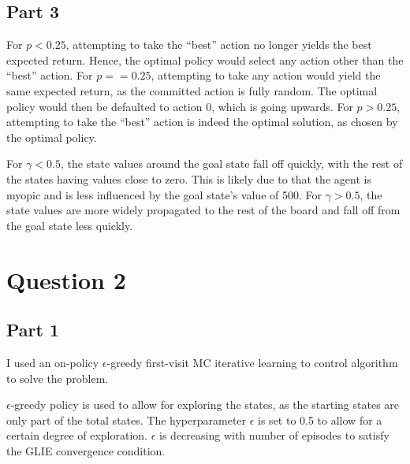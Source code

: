 \documentclass{article}
\begin{document}
    \subsection{Part 3}\label{subsec:question-1-3}
    For $p < 0.25$, attempting to take the ``best'' action no longer yields the best expected return.
    Hence, the optimal policy would select any action other than the ``best'' action.
    For $p == 0.25$, attempting to take any action would yield the same expected return, as the committed action is fully random.
    The optimal policy would then be defaulted to action 0, which is going upwards.
    For $p > 0.25$, attempting to take the ``best'' action is indeed the optimal solution, as chosen by the optimal policy.

    For $\gamma < 0.5$, the state values around the goal state fall off quickly, with the rest of the states having values close to zero.
    This is likely due to that the agent is myopic and is less influenced by the goal state's value of 500.
    For $\gamma > 0.5$, the state values are more widely propagated to the rest of the board and fall off from the goal state less quickly.


    \section{Question 2}\label{sec:question-2}

    \subsection{Part 1}\label{subsec:question-2-1}
    I used an on-policy $\epsilon$-greedy first-visit MC iterative learning to control algorithm to solve the problem.

    $\epsilon$-greedy policy is used to allow for exploring the states, as the starting states are only part of the total states.
    The hyperparameter $\epsilon$ is set to 0.5 to allow for a certain degree of exploration.
    $\epsilon$ is decreasing with number of episodes to satisfy the GLIE convergence condition.
\end{document}
